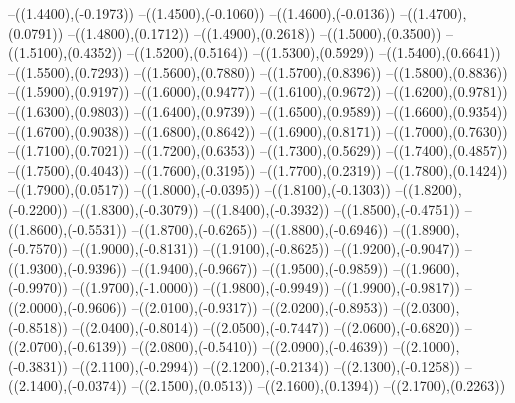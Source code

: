{	--({\sx*(1.4400)},{\sy*(-0.1973)})
	--({\sx*(1.4500)},{\sy*(-0.1060)})
	--({\sx*(1.4600)},{\sy*(-0.0136)})
	--({\sx*(1.4700)},{\sy*(0.0791)})
	--({\sx*(1.4800)},{\sy*(0.1712)})
	--({\sx*(1.4900)},{\sy*(0.2618)})
	--({\sx*(1.5000)},{\sy*(0.3500)})
	--({\sx*(1.5100)},{\sy*(0.4352)})
	--({\sx*(1.5200)},{\sy*(0.5164)})
	--({\sx*(1.5300)},{\sy*(0.5929)})
	--({\sx*(1.5400)},{\sy*(0.6641)})
	--({\sx*(1.5500)},{\sy*(0.7293)})
	--({\sx*(1.5600)},{\sy*(0.7880)})
	--({\sx*(1.5700)},{\sy*(0.8396)})
	--({\sx*(1.5800)},{\sy*(0.8836)})
	--({\sx*(1.5900)},{\sy*(0.9197)})
	--({\sx*(1.6000)},{\sy*(0.9477)})
	--({\sx*(1.6100)},{\sy*(0.9672)})
	--({\sx*(1.6200)},{\sy*(0.9781)})
	--({\sx*(1.6300)},{\sy*(0.9803)})
	--({\sx*(1.6400)},{\sy*(0.9739)})
	--({\sx*(1.6500)},{\sy*(0.9589)})
	--({\sx*(1.6600)},{\sy*(0.9354)})
	--({\sx*(1.6700)},{\sy*(0.9038)})
	--({\sx*(1.6800)},{\sy*(0.8642)})
	--({\sx*(1.6900)},{\sy*(0.8171)})
	--({\sx*(1.7000)},{\sy*(0.7630)})
	--({\sx*(1.7100)},{\sy*(0.7021)})
	--({\sx*(1.7200)},{\sy*(0.6353)})
	--({\sx*(1.7300)},{\sy*(0.5629)})
	--({\sx*(1.7400)},{\sy*(0.4857)})
	--({\sx*(1.7500)},{\sy*(0.4043)})
	--({\sx*(1.7600)},{\sy*(0.3195)})
	--({\sx*(1.7700)},{\sy*(0.2319)})
	--({\sx*(1.7800)},{\sy*(0.1424)})
	--({\sx*(1.7900)},{\sy*(0.0517)})
	--({\sx*(1.8000)},{\sy*(-0.0395)})
	--({\sx*(1.8100)},{\sy*(-0.1303)})
	--({\sx*(1.8200)},{\sy*(-0.2200)})
	--({\sx*(1.8300)},{\sy*(-0.3079)})
	--({\sx*(1.8400)},{\sy*(-0.3932)})
	--({\sx*(1.8500)},{\sy*(-0.4751)})
	--({\sx*(1.8600)},{\sy*(-0.5531)})
	--({\sx*(1.8700)},{\sy*(-0.6265)})
	--({\sx*(1.8800)},{\sy*(-0.6946)})
	--({\sx*(1.8900)},{\sy*(-0.7570)})
	--({\sx*(1.9000)},{\sy*(-0.8131)})
	--({\sx*(1.9100)},{\sy*(-0.8625)})
	--({\sx*(1.9200)},{\sy*(-0.9047)})
	--({\sx*(1.9300)},{\sy*(-0.9396)})
	--({\sx*(1.9400)},{\sy*(-0.9667)})
	--({\sx*(1.9500)},{\sy*(-0.9859)})
	--({\sx*(1.9600)},{\sy*(-0.9970)})
	--({\sx*(1.9700)},{\sy*(-1.0000)})
	--({\sx*(1.9800)},{\sy*(-0.9949)})
	--({\sx*(1.9900)},{\sy*(-0.9817)})
	--({\sx*(2.0000)},{\sy*(-0.9606)})
	--({\sx*(2.0100)},{\sy*(-0.9317)})
	--({\sx*(2.0200)},{\sy*(-0.8953)})
	--({\sx*(2.0300)},{\sy*(-0.8518)})
	--({\sx*(2.0400)},{\sy*(-0.8014)})
	--({\sx*(2.0500)},{\sy*(-0.7447)})
	--({\sx*(2.0600)},{\sy*(-0.6820)})
	--({\sx*(2.0700)},{\sy*(-0.6139)})
	--({\sx*(2.0800)},{\sy*(-0.5410)})
	--({\sx*(2.0900)},{\sy*(-0.4639)})
	--({\sx*(2.1000)},{\sy*(-0.3831)})
	--({\sx*(2.1100)},{\sy*(-0.2994)})
	--({\sx*(2.1200)},{\sy*(-0.2134)})
	--({\sx*(2.1300)},{\sy*(-0.1258)})
	--({\sx*(2.1400)},{\sy*(-0.0374)})
	--({\sx*(2.1500)},{\sy*(0.0513)})
	--({\sx*(2.1600)},{\sy*(0.1394)})
	--({\sx*(2.1700)},{\sy*(0.2263)})
}
